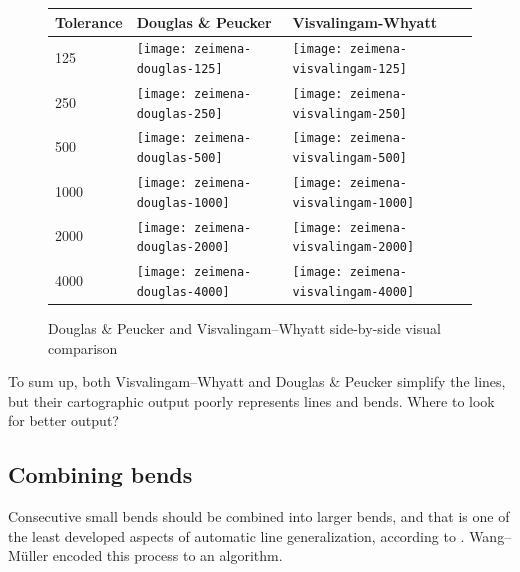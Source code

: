 \documentclass[a4paper]{article}
\newcommand{\DP}{Douglas \& Peucker}
\newcommand{\VW}{Visvalingam--Whyatt}
\newcommand{\WM}{Wang--M{\"u}ller}
\begin{document}
\begin{figure}[H]
    \renewcommand{\tabularxcolumn}[1]{>{\center\small}m{#1}}
    \begin{tabularx}{\textwidth}{ p{1.5cm} | X | X | }
        Tolerance                                                 &
        Douglas \& Peucker                                        &
        Visvalingam-Whyatt                                        \tabularnewline \hline

        125                                                       &
        \texttt{[image: zeimena-douglas-125]}           &
        \texttt{[image: zeimena-visvalingam-125]}       \tabularnewline \hline

        250                                                       &
        \texttt{[image: zeimena-douglas-250]}         &
        \texttt{[image: zeimena-visvalingam-250]}     \tabularnewline \hline

        500                                                       &
        \texttt{[image: zeimena-douglas-500]}        &
        \texttt{[image: zeimena-visvalingam-500]}    \tabularnewline \hline

        1000                                                      &
        \texttt{[image: zeimena-douglas-1000]}      &
        \texttt{[image: zeimena-visvalingam-1000]}  \tabularnewline \hline

        2000                                                      &
        \texttt{[image: zeimena-douglas-2000]}     &
        \texttt{[image: zeimena-visvalingam-2000]} \tabularnewline \hline

        4000                                                      &
        \texttt{[image: zeimena-douglas-4000]}     &
        \texttt{[image: zeimena-visvalingam-4000]} \tabularnewline \hline
    \end{tabularx}
    \caption{{\DP} and {\VW} side-by-side visual comparison}
    \label{tab:dp-vs-vw}
\end{figure}

To sum up, both {\VW} and {\DP} simplify the lines, but their cartographic
output poorly represents lines and bends. Where to look for better output?

\subsection{Combining bends}

Consecutive small bends should be combined into larger bends, and that is one
of the least developed aspects of automatic line generalization, according to
\cite{miuller1995generalization}. {\WM} encoded this process to an algorithm.
\end{document}
